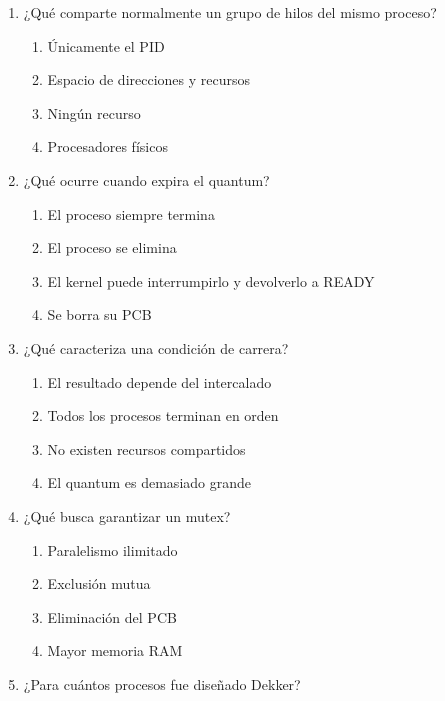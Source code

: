 \documentclass[
  spanish,
  letterpaper,
]{scrbook}
\providecommand{\tightlist}{%
  \setlength{\itemsep}{0pt}\setlength{\parskip}{0pt}}
\begin{document}
\begin{enumerate}
\def\labelenumi{\arabic{enumi}.}
\item
  ¿Qué comparte normalmente un grupo de hilos del mismo proceso?

  \begin{enumerate}
  \def\labelenumii{\alph{enumii}.}
  \tightlist
  \item
    Únicamente el PID\\
  \item
    Espacio de direcciones y recursos\\
  \item
    Ningún recurso\\
  \item
    Procesadores físicos
  \end{enumerate}
\item
  ¿Qué ocurre cuando expira el quantum?

  \begin{enumerate}
  \def\labelenumii{\alph{enumii}.}
  \tightlist
  \item
    El proceso siempre termina\\
  \item
    El proceso se elimina\\
  \item
    El kernel puede interrumpirlo y devolverlo a READY\\
  \item
    Se borra su PCB
  \end{enumerate}
\item
  ¿Qué caracteriza una condición de carrera?

  \begin{enumerate}
  \def\labelenumii{\alph{enumii}.}
  \tightlist
  \item
    El resultado depende del intercalado\\
  \item
    Todos los procesos terminan en orden\\
  \item
    No existen recursos compartidos\\
  \item
    El quantum es demasiado grande
  \end{enumerate}
\item
  ¿Qué busca garantizar un mutex?

  \begin{enumerate}
  \def\labelenumii{\alph{enumii}.}
  \tightlist
  \item
    Paralelismo ilimitado\\
  \item
    Exclusión mutua\\
  \item
    Eliminación del PCB\\
  \item
    Mayor memoria RAM
  \end{enumerate}
\item
  ¿Para cuántos procesos fue diseñado Dekker?


\end{enumerate}
\end{document}
